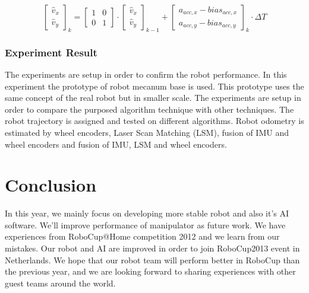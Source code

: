 \documentclass{llncs}
\begin{document}
\begin{equation}
\label{eq:4}
\begin{bmatrix}
\hat{v}_{x} \\
\hat{v}_{y}
\end{bmatrix}_{k} = 
\begin{bmatrix}
1 & 0 \\
0 & 1 
\end{bmatrix} \cdot
\begin{bmatrix}
\hat{v}_{x} \\
\hat{v}_{y}
\end{bmatrix}_{k-1} +
\begin{bmatrix}
a_{acc,x}-bias_{acc,x} \\
a_{acc,y}-bias_{acc,y}
\end{bmatrix}_{k} \cdot \Delta T
\end{equation}

\subsubsection{Experiment Result}

The experiments are setup in order to confirm the robot performance. In this experiment the prototype of robot mecanum base is used. This prototype uses the same concept of the real robot but in smaller scale. The experiments are setup in order to compare the purposed algorithm technique with other techniques. The robot trajectory is assigned and tested on different algorithms. Robot odometry is estimated by wheel encoders, Laser Scan Matching (LSM), fusion of IMU and wheel encoders and fusion of IMU, LSM and wheel encoders.

\section{Conclusion}

In this year, we mainly focus on developing more stable robot and also it's AI software. We'll improve performance of manipulator as future work. We have experiences from RoboCup@Home competition 2012 and we learn from our mistakes. Our robot and AI are improved in order to join RoboCup2013 event in Netherlands. We hope that our robot team will perform better in RoboCup than the previous year, and we are looking forward to sharing experiences with other guest teams around the world.
\end{document}
